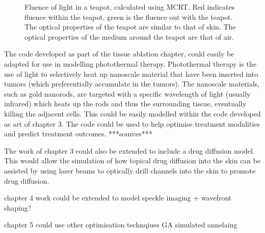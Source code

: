 \begin{figure}[!htpb]
    \centering
    \caption{Fluence of light in a teapot, calculated using MCRT. Red indicates fluence within the teapot, green is the fluence out with the teapot. The optical properties of the teapot are similar to that of skin. The optical properties of the medium around the teapot are that of air.}
    \label{fig:fmesh}
\end{figure}

The code developed as part of the tissue ablation chapter, could easily be adapted for use in modelling photothermal therapy.
Photothermal therapy is the use of light to selectively heat up nanoscale material that have been inserted into tumors (which preferentially accumulate in the tumors).
The nanoscale materials, such as gold nanorods, are targeted with a specific wavelength of light (usually infrared) which heats up the rods and thus the surrounding tissue, eventually killing the adjacent cells.
This could be easily modelled within the code developed as art of chapter 3.
The code could be used to help optimise treatment modalities and predict treatment outcomes. ***sources***

The work of chapter 3 could also be extended to include a drug diffusion model.
This would allow the simulation of how topical drug diffusion into the skin can be assisted by using laser beams to optically drill channels into the skin to promote drug diffusion.

chapter 4 work could be extended to model speckle imaging + wavefront shaping?


chapter 5 could use other optimisation technqiues GA simulated annelaing

